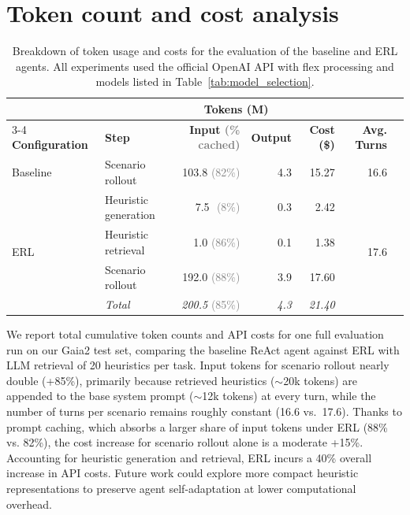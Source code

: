 \documentclass{article}
\begin{document}
\section{Token count and cost analysis}\label{appendix:tokens_cost}

\begin{table}[H]
  \centering
  \small
  \begin{tabular}{llrrrrr}
    \toprule
    & & \multicolumn{2}{c}{\textbf{Tokens (M)}} & & \\
    \cmidrule(lr){3-4}
    \textbf{Configuration} & \textbf{Step} & \textbf{Input \scriptsize\textcolor{gray}{(\% cached)}} & \textbf{Output} & \textbf{Cost (\$)} & \textbf{Avg. Turns} \\
    \midrule
    Baseline & Scenario rollout  & 103.8 {\scriptsize\textcolor{gray}{(82\%)}} & 4.3 & 15.27 & \multirow{1}{*}{16.6} \\
    \midrule
    \multirow{4}{*}{ERL}
    & Heuristic generation & 7.5\,\, {\scriptsize\textcolor{gray}{(8\%)}}    & 0.3 & 2.42  & \multirow{4}{*}{17.6} \\
    & Heuristic retrieval            & 1.0 {\scriptsize\textcolor{gray}{(86\%)}}   & 0.1 & 1.38  & \\
    & Scenario rollout   & 192.0 {\scriptsize\textcolor{gray}{(88\%)}} & 3.9 & 17.60 & \\
    \cmidrule{2-5}
    & \textit{Total}       & \textit{200.5} {\scriptsize\textcolor{gray}{(85\%)}} & \textit{4.3} & \textit{21.40} & \\
    \bottomrule
  \end{tabular}
  \caption{Breakdown of token usage and costs for the evaluation of the baseline and ERL agents. All experiments used the official OpenAI API with flex processing and models listed in Table~\ref{tab:model_selection}.}
  \label{tab:computational_overhead}
\end{table}

We report total cumulative token counts and API costs for one full evaluation run on our Gaia2 test set, comparing the baseline ReAct agent against ERL with LLM retrieval of 20 heuristics per task. Input tokens for scenario rollout nearly double (+85\%), primarily because retrieved heuristics ($\sim$20k tokens) are appended to the base system prompt ($\sim$12k tokens) at every turn, while the number of turns per scenario remains roughly constant (16.6 vs.\ 17.6). Thanks to prompt caching, which absorbs a larger share of input tokens under ERL (88\% vs. 82\%), the cost increase for scenario rollout alone is a moderate +15\%. Accounting for heuristic generation and retrieval, ERL incurs a 40\% overall increase in API costs. Future work could explore more compact heuristic representations to preserve agent self-adaptation at lower computational overhead.
\end{document}
